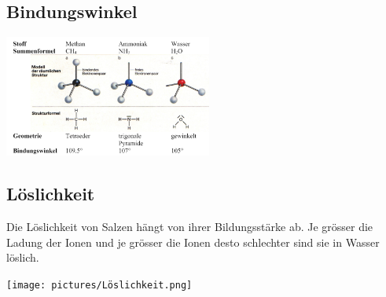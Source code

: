 \subsection{Bindungswinkel}
    \begin{center}
    \includegraphics[height=4cm]{pictures/Winkel.png}
    \end{center}
\subsection{Löslichkeit}
    Die Löslichkeit von Salzen hängt von ihrer Bildungsstärke ab. Je grösser die Ladung der Ionen und je grösser die Ionen desto schlechter sind sie in Wasser löslich.
    \begin{center}
    \texttt{[image: pictures/Löslichkeit.png]}
    \end{center}